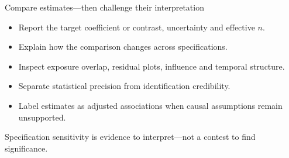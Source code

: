 \documentclass[10pt,aspectratio=169]{beamer}
\begin{document}
\begin{frame}{Compare estimates---then challenge their interpretation}

\small

\begin{center}
\end{center}

\vspace{0.25cm}

\begin{itemize}
  \item Report the target coefficient or contrast, uncertainty and effective $n$.
  \item Explain how the comparison changes across specifications.
  \item Inspect exposure overlap, residual plots, influence and temporal structure.
  \item Separate statistical precision from identification credibility.
  \item Label estimates as adjusted associations when causal assumptions remain unsupported.
\end{itemize}

\vspace{0.15cm}

\centering
\textcolor{ukudlaRed}{Specification sensitivity is evidence to interpret---not a contest to find significance.}

\end{frame}


\end{document}
